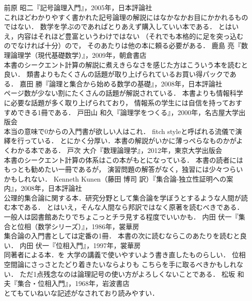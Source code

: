 \begin{thebibliography}{99}
  前原 昭二『記号論理入門』，2005年，日本評論社 \\
 これほどわかりやすく書かれた記号論理の解説にはなかなかお目にかかれるものではない．
 数学を学ぶのであればとりあえず購入していい本である．
 とはいえ，内容はそれほど豊富というわけではない
 （それでも本格的に足を突っ込むのでなければ十分）ので，
 そのあたりは他の本に頼る必要がある．
  鹿島 亮『数理論理学（現代基礎数学）』，2009年，朝倉書店 \\
 本書のシークエント計算の解説に煮えきらなさを感じた方はこういう本を読むと良い．
 類書よりもたくさんの話題が取り上げられているお買い得パックである．
  嘉田 勝『論理と集合から始める数学の基礎』，2008年，日本評論社 \\
 ページ数が少ない割にたくさんの話題が解説されている．
 本書よりも情報科学に必要な話題が多く取り上げられており，
 情報系の学生には自信を持っておすすめできる1冊である．
  戸田山 和久『論理学をつくる』，2000年，名古屋大学出版会 \\
 本当の意味で0からの入門書が欲しい人はこれ．
 fitch styleと呼ばれる流儀で演繹を行っている．
 とにかく分厚い．本書の解説がいかに薄っぺらなものかがよくわかる本である．
  戸次 大介『数理論理学』，2012年，東京大学出版会 \\
 本書のシークエント計算の体系はこの本がもとになっている．
 本書の読者にはもっとも勧めたい一冊であるが，
 演習問題の解答がなく，独習には少々つらいかもしれない．
  Kenneth Kunen（藤田 博司 訳）『集合論-独立性証明への案内』，2008年，日本評論社 \\
 公理的集合論に関する本．研究分野として集合論を学ぼうとするような人間が読む本である．
 とはいえ，そんな人間なら邦訳ではなく原著を読むべきである．
 一般人は図書館あたりでちょこっとチラ見する程度でいいかも．
 内田 伏一『集合と位相（数学シリーズ）』，1986年，裳華房 \\
 集合論の入門書としては定番の1冊．
 本書の次に読むならこのあたりを読むと良い．
  内田 伏一『位相入門』，1997年，裳華房 \\
 同著者による本．{\cite{utidaset}}を
 大学の講義で使いやすいよう書き直したものらしい．
 位相空間論にさっさとたどり着きたいなら{\cite{utidaset}}よりも
 こちらを手に取るべきかもしれない．
 ただ1点残念なのは論理記号の使い方がよろしくないことである．
  松坂 和夫『集合・位相入門』，1968年，岩波書店 \\
 とてもていねいな記述がなされており読みやすい．

\end{thebibliography}
